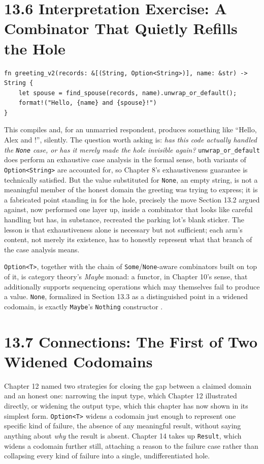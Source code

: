 \documentclass[11pt]{book}
\begin{document}
\section*{13.6 Interpretation Exercise: A Combinator That Quietly Refills the Hole}

\begin{lstlisting}
fn greeting_v2(records: &[(String, Option<String>)], name: &str) -> String {
    let spouse = find_spouse(records, name).unwrap_or_default();
    format!("Hello, {name} and {spouse}!")
}
\end{lstlisting}

This compiles and, for an unmarried respondent, produces something like ``Hello, Alex and !'', silently. The question worth asking is: \emph{has this code actually handled the \texttt{None} case, or has it merely made the hole invisible again?} \texttt{unwrap\_or\_default} does perform an exhaustive case analysis in the formal sense, both variants of \texttt{Option<String>} are accounted for, so Chapter 8's exhaustiveness guarantee is technically satisfied. But the value substituted for \texttt{None}, an empty string, is not a meaningful member of the honest domain the greeting was trying to express; it is a fabricated point standing in for the hole, precisely the move Section 13.2 argued against, now performed one layer up, inside a combinator that looks like careful handling but has, in substance, recreated the parking lot's blank sticker. The lesson is that exhaustiveness alone is necessary but not sufficient; each arm's content, not merely its existence, has to honestly represent what that branch of the case analysis means.

\begin{categorybox}
\texttt{Option<T>}, together with the chain of \texttt{Some}/\texttt{None}-aware combinators built on top of it, is category theory's \emph{Maybe} monad: a functor, in Chapter 10's sense, that additionally supports sequencing operations which may themselves fail to produce a value. \texttt{None}, formalized in Section 13.3 as a distinguished point in a widened codomain, is exactly \texttt{Maybe}'s \texttt{Nothing} constructor \cite{milewski2019}.
\end{categorybox}

\section*{13.7 Connections: The First of Two Widened Codomains}

Chapter 12 named two strategies for closing the gap between a claimed domain and an honest one: narrowing the input type, which Chapter 12 illustrated directly, or widening the output type, which this chapter has now shown in its simplest form. \texttt{Option<T>} widens a codomain just enough to represent one specific kind of failure, the absence of any meaningful result, without saying anything about \emph{why} the result is absent. Chapter 14 takes up \texttt{Result}, which widens a codomain further still, attaching a reason to the failure case rather than collapsing every kind of failure into a single, undifferentiated hole.
\end{document}
